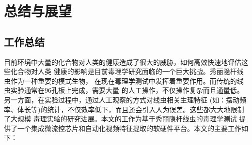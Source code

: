 \chapter{总结与展望}
\section{工作总结}
	目前环境中大量的化合物对人类的健康造成了很大的威胁，如何高效快速地评估这些化合物对人类
	健康的影响是目前毒理学研究面临的一个巨大挑战。秀丽隐杆线虫作为一种重要的模式生物，
	在现在毒理学测试中发挥着重要作用。而传统的线虫实验通常在96孔板上完成，需要大量
	的人工操作，不仅操作复杂而且通量低。另一方面，在实验过程中，通过人工观察的方式对线虫相关生理特征
	(如：摆动频率、体长等)的统计，不仅效率低下，而且还会引入人为误差。这些都大大地限制了大规模
	毒理实验的研究进展。本文的工作为基于秀丽隐杆线虫的毒理学测试
	提供了一个集成微流控芯片和自动化视频特征提取的软硬件平台。本文的主要工作如下：
